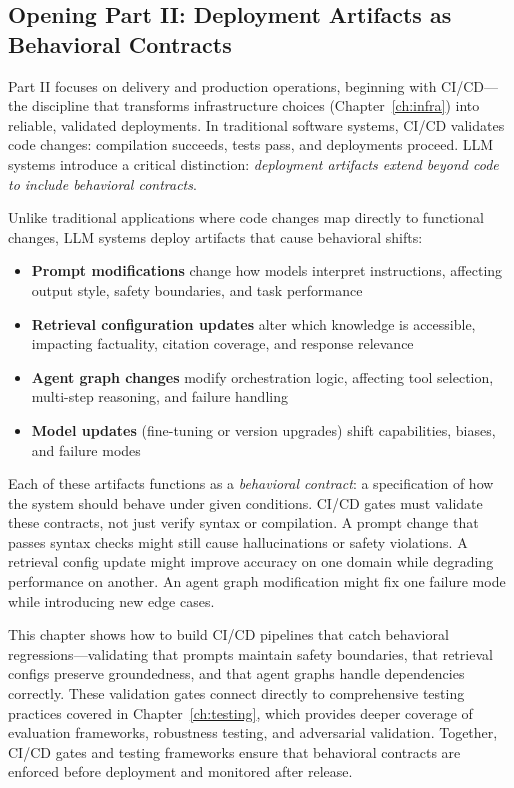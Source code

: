 \subsection{Opening Part II: Deployment Artifacts as Behavioral Contracts}
\label{subsec:cicd-part2-opening}

Part II focuses on delivery and production operations, beginning with CI/CD—the discipline that transforms infrastructure choices (Chapter~\ref{ch:infra}) into reliable, validated deployments. In traditional software systems, CI/CD validates code changes: compilation succeeds, tests pass, and deployments proceed. LLM systems introduce a critical distinction: \emph{deployment artifacts extend beyond code to include behavioral contracts}.

Unlike traditional applications where code changes map directly to functional changes, LLM systems deploy artifacts that cause behavioral shifts:
\begin{itemize}
    \item \textbf{Prompt modifications} change how models interpret instructions, affecting output style, safety boundaries, and task performance
    \item \textbf{Retrieval configuration updates} alter which knowledge is accessible, impacting factuality, citation coverage, and response relevance
    \item \textbf{Agent graph changes} modify orchestration logic, affecting tool selection, multi-step reasoning, and failure handling
    \item \textbf{Model updates} (fine-tuning or version upgrades) shift capabilities, biases, and failure modes
\end{itemize}

Each of these artifacts functions as a \emph{behavioral contract}: a specification of how the system should behave under given conditions. CI/CD gates must validate these contracts, not just verify syntax or compilation. A prompt change that passes syntax checks might still cause hallucinations or safety violations. A retrieval config update might improve accuracy on one domain while degrading performance on another. An agent graph modification might fix one failure mode while introducing new edge cases.

This chapter shows how to build CI/CD pipelines that catch behavioral regressions—validating that prompts maintain safety boundaries, that retrieval configs preserve groundedness, and that agent graphs handle dependencies correctly. These validation gates connect directly to comprehensive testing practices covered in Chapter~\ref{ch:testing}, which provides deeper coverage of evaluation frameworks, robustness testing, and adversarial validation. Together, CI/CD gates and testing frameworks ensure that behavioral contracts are enforced before deployment and monitored after release.

